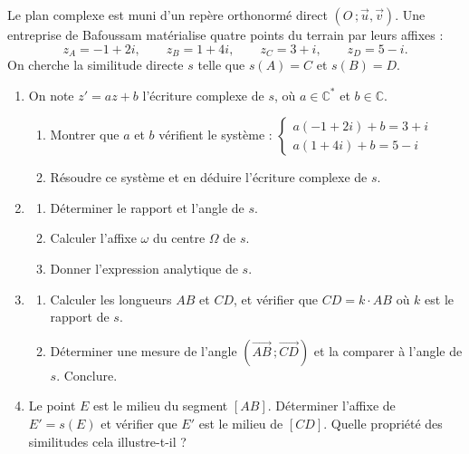 \documentclass[11pt]{article}
\begin{document}
\begin{exercice}
Le plan complexe est muni d'un repère orthonormé direct $(O\,;\vec{u},\vec{v})$. Une entreprise de Bafoussam matérialise quatre points du terrain par leurs affixes :
\[ z_A = -1 + 2i, \qquad z_B = 1 + 4i, \qquad z_C = 3 + i, \qquad z_D = 5 - i. \]
On cherche la similitude directe $s$ telle que $s(A) = C$ et $s(B) = D$.
\begin{enumerate}
\item On note $z' = az + b$ l'écriture complexe de $s$, où $a \in \mathbb{C}^*$ et $b \in \mathbb{C}$.
\begin{enumerate}
\item Montrer que $a$ et $b$ vérifient le système :
$\begin{cases} a(-1 + 2i) + b = 3 + i \\ a(1 + 4i) + b = 5 - i \end{cases}$
\item Résoudre ce système et en déduire l'écriture complexe de $s$.
\end{enumerate}
\item \begin{enumerate}
\item Déterminer le rapport et l'angle de $s$.
\item Calculer l'affixe $\omega$ du centre $\Omega$ de $s$.
\item Donner l'expression analytique de $s$.
\end{enumerate}
\item \begin{enumerate}
\item Calculer les longueurs $AB$ et $CD$, et vérifier que $CD = k \cdot AB$ où $k$ est le rapport de $s$.
\item Déterminer une mesure de l'angle $\left(\overrightarrow{AB}\,;\overrightarrow{CD}\right)$ et la comparer à l'angle de $s$. Conclure.
\end{enumerate}
\item Le point $E$ est le milieu du segment $[AB]$. Déterminer l'affixe de $E' = s(E)$ et vérifier que $E'$ est le milieu de $[CD]$. Quelle propriété des similitudes cela illustre-t-il ?
\end{enumerate}
\end{exercice}
\end{document}
